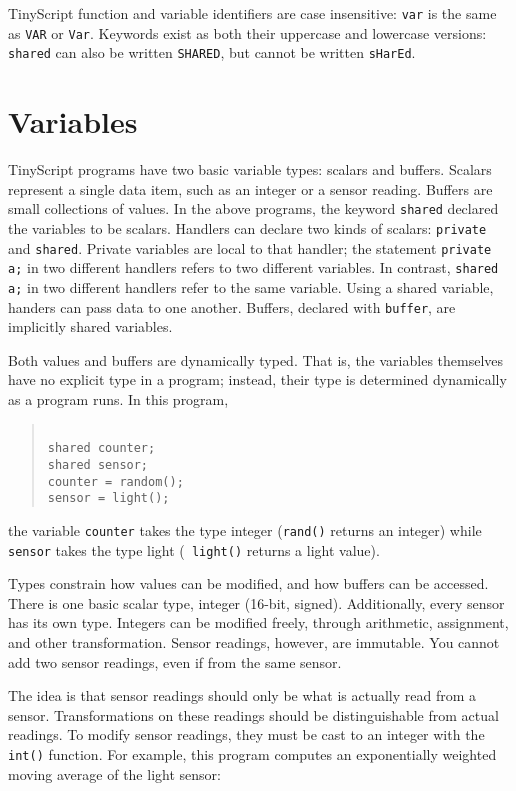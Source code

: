 \documentclass[12pt]{article}
\begin{document}
TinyScript function and variable identifiers are case insensitive:
{\tt var} is the same as {\tt VAR} or {\tt Var}. Keywords exist as
both their uppercase and lowercase versions: {\tt shared} can also be
written {\tt SHARED}, but cannot be written {\tt sHarEd}.

\section{Variables}
\label{sec:variables}

TinyScript programs have two basic variable types: scalars and
buffers. Scalars represent a single data item, such as an integer or a
sensor reading. Buffers are small collections of values. In the above
programs, the keyword {\tt shared} declared the variables to be
scalars. Handlers can declare two kinds of scalars: {\tt private} and
{\tt shared}. Private variables are local to that handler; the
statement {\tt private a;} in two different handlers refers to two
different variables. In contrast, {\tt shared a;} in two different
handlers refer to the same variable. Using a shared variable, handers
can pass data to one another. Buffers, declared with {\tt buffer}, are
implicitly shared variables.

Both values and buffers are dynamically typed. That is, the variables
themselves have no explicit type in a program; instead, their type
is determined dynamically as a program runs. In this program,

\begin{quotation}
\begin{verbatim}

shared counter; 
shared sensor;
counter = random();
sensor = light();

\end{verbatim}
\end{quotation}

the variable {\tt counter} takes the type integer ({\tt rand()}
returns an integer) while {\tt sensor} takes the type light ({\tt
light()} returns a light value).

Types constrain how values can be modified, and how buffers can be
accessed. There is one basic scalar type, integer (16-bit, signed).
Additionally, every sensor has its own type. Integers can be modified
freely, through arithmetic, assignment, and other
transformation. Sensor readings, however, are immutable. You cannot
add two sensor readings, even if from the same sensor.

The idea is that sensor readings should only be what is actually read
from a sensor. Transformations on these readings should be
distinguishable from actual readings.  To modify sensor readings, they
must be cast to an integer with the {\tt int()} function. For example,
this program computes an exponentially weighted moving average of the
light sensor:
\end{document}
